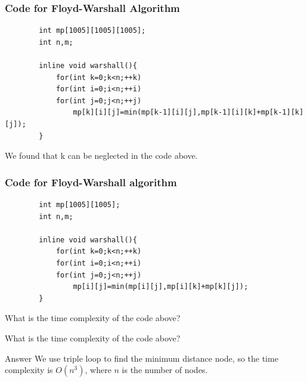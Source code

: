 \documentclass[xcolor=dvipsnames]{beamer}
\begin{document}
    \begin{frame}[fragile]
        \frametitle{Code for Floyd-Warshall Algorithm}
        \begin{verbatim}
        int mp[1005][1005][1005];
        int n,m;

        inline void warshall(){
            for(int k=0;k<n;++k)
            for(int i=0;i<n;++i)
            for(int j=0;j<n;++j)
                mp[k][i][j]=min(mp[k-1][i][j],mp[k-1][i][k]+mp[k-1][k][j]);
        }
        \end{verbatim}
    \end{frame}
    \begin{frame}[fragile]
        We found that k can be neglected in the code above.
        \frametitle{Code for Floyd-Warshall algorithm}
        \begin{verbatim}
        int mp[1005][1005];
        int n,m;

        inline void warshall(){
            for(int k=0;k<n;++k)
            for(int i=0;i<n;++i)
            for(int j=0;j<n;++j)
                mp[i][j]=min(mp[i][j],mp[i][k]+mp[k][j]);
        }
        \end{verbatim}
    \end{frame}

    \begin{frame}
        What is the time complexity of the code above?

    \end{frame}
    \begin{frame}
        What is the time complexity of the code above?
        \begin{block}{Answer}
            We use triple loop to find the minimum distance node,
            so the time complexity is $O(n^3)$, where $n$ is the number of nodes.
        \end{block}
    \end{frame}
\end{document}
